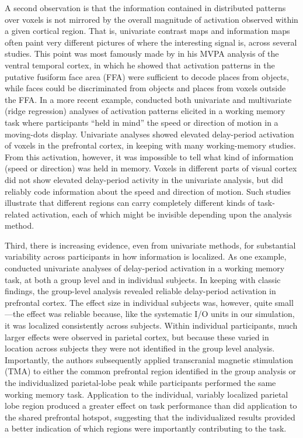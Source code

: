 A second observation is that the information contained in distributed patterns over voxels is not mirrored by the overall magnitude of activation observed within a given cortical region. That is, univariate contrast maps and information maps often paint very different pictures of where the interesting signal is, across several studies. This point was most famously made by  in his MVPA analysis of the ventral temporal cortex, in which he showed that activation patterns in the putative fusiform face area (FFA) were sufficient to decode places from objects, while faces could be discriminated from objects and places from voxels outside the FFA. In a more recent example,  conducted both univariate and multivariate (ridge regression) analyses of activation patterns elicited in a working memory task where participants ``held in mind'' the speed or direction of motion in a moving-dots display. Univariate analyses showed elevated delay-period activation of voxels in the prefrontal cortex, in keeping with many working-memory studies. From this activation, however, it was impossible to tell what kind of information (speed or direction) was held in memory. Voxels in different parts of visual cortex did not show elevated delay-period activity in the univariate analysis, but did reliably code information about the speed and direction of motion. Such studies illustrate that different regions can carry completely different kinds of task-related activation, each of which might be invisible depending upon the analysis method.

Third, there is increasing evidence, even from univariate methods, for substantial variability across participants in how information is localized. As one example,  conducted univariate analyses of delay-period activation in a working memory task, at both a group level and in individual subjects. In keeping with classic findings, the group-level analysis revealed reliable delay-period activation in prefrontal cortex. The effect size in individual subjects was, however, quite small---the effect was reliable because, like the systematic I/O units in our simulation, it was localized consistently across subjects. Within individual participants, much larger effects were observed in parietal cortex, but because these varied in location across subjects they were not identified in the group level analysis. Importantly, the authors subsequently applied transcranial magnetic stimulation (TMA) to either the common prefrontal region identified in the group analysis or the individualized parietal-lobe peak while participants performed the same working memory task. Application to the individual, variably localized parietal lobe region produced a greater effect on task performance than did application to the shared prefrontal hotspot, suggesting that the individualized results provided a better indication of which regions were importantly contributing to the task.

